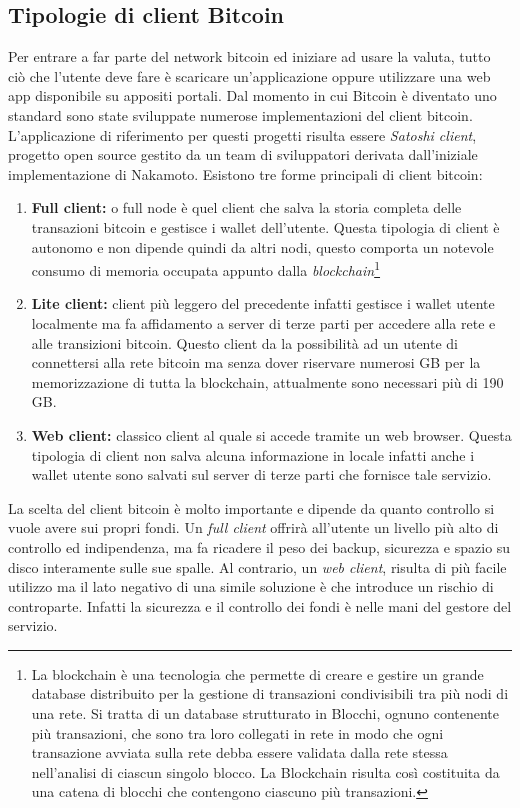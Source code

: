 \subsection*{Tipologie di client Bitcoin}
Per entrare a far parte del network bitcoin ed iniziare ad usare la valuta, tutto ciò che l'utente deve fare è scaricare un'applicazione oppure utilizzare una web app disponibile su appositi portali. Dal momento in cui Bitcoin è diventato uno standard sono state sviluppate numerose implementazioni del client bitcoin. L'applicazione di riferimento per questi progetti risulta essere \textit{Satoshi client}, progetto open source gestito da un team di sviluppatori derivata dall'iniziale implementazione di Nakamoto. Esistono tre forme principali di client bitcoin:
\begin{enumerate}
	\item \textbf{Full client:} o full node è quel client che salva la storia completa delle transazioni bitcoin e gestisce i wallet dell'utente. Questa tipologia di client è autonomo e non dipende quindi da altri nodi, questo comporta un notevole consumo di memoria occupata appunto dalla \textit{blockchain}\footnote{La blockchain è una tecnologia che permette di creare e gestire un grande database distribuito per la gestione di transazioni condivisibili tra più nodi di una rete. Si tratta di un database strutturato in Blocchi, ognuno contenente più transazioni, che sono tra loro collegati in rete in modo che ogni transazione avviata sulla rete debba essere validata dalla rete stessa nell'analisi di ciascun singolo blocco. La Blockchain risulta così costituita da una catena di blocchi che contengono ciascuno più transazioni.}
	\item \textbf{Lite client:} client più leggero del precedente infatti gestisce i wallet utente localmente ma fa affidamento a server di terze parti per accedere alla rete e alle transizioni bitcoin. Questo client da la possibilità ad un utente di connettersi alla rete bitcoin ma senza dover riservare numerosi GB per la memorizzazione di tutta la blockchain, attualmente sono necessari più di 190 GB.
	\item \textbf{Web client:} classico client al quale si accede tramite un web browser. Questa tipologia di client non salva alcuna informazione in locale infatti anche i wallet utente sono salvati sul server di terze parti che fornisce tale servizio.
\end{enumerate}
La scelta del client bitcoin è molto importante e dipende da quanto controllo si vuole avere sui propri fondi. Un \textit{full client} offrirà all'utente un livello più alto di controllo ed indipendenza, ma fa ricadere il peso dei backup, sicurezza e spazio su disco interamente sulle sue spalle. Al contrario, un \textit{web client}, risulta di più facile utilizzo ma il lato negativo di una simile soluzione è che introduce un rischio di controparte. Infatti la sicurezza e il controllo dei fondi è nelle mani del gestore del servizio. 

